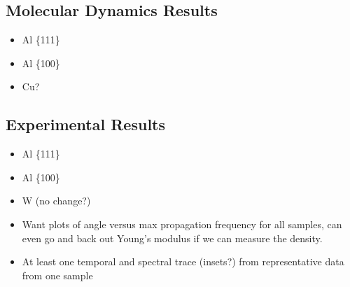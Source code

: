  
\subsection{Molecular Dynamics Results}
\begin{itemize}
\item Al \{111\}
\item Al \{100\}
\item Cu?
\end{itemize}

\subsection{Experimental Results}
\begin{itemize}
\item Al \{111\}
\item Al \{100\}
\item W (no change?)
\item Want plots of angle versus max propagation frequency for all samples, can even go and back out Young's modulus if we can measure the density. 
\item At least one temporal and spectral trace (insets?) from representative data from one sample
\end{itemize}
